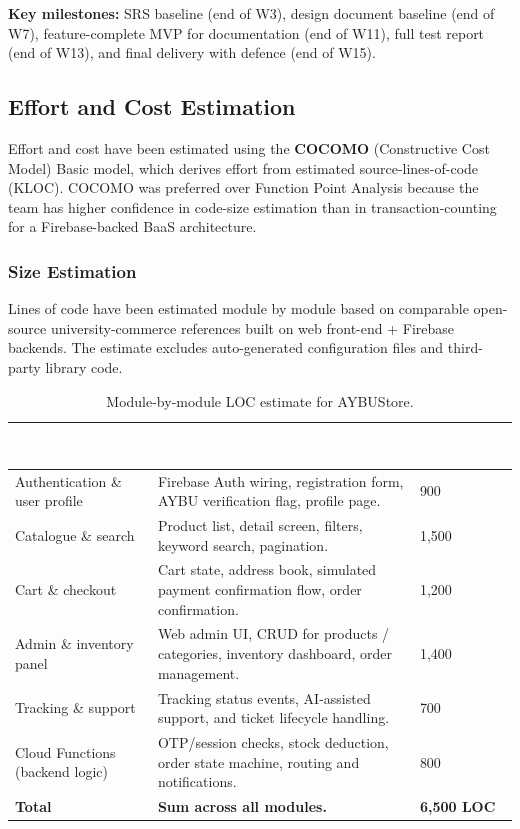 \documentclass[11pt,a4paper]{article}
\begin{document}
\noindent
\textbf{Key milestones:} SRS baseline (end of W3), design document
baseline (end of W7), feature-complete MVP for documentation
(end of W11), full test report (end of W13), and final delivery with
defence (end of W15).
 
\subsection{Effort and Cost Estimation}
\label{subsec:effort-cost}
Effort and cost have been estimated using the \textbf{COCOMO}
(Constructive Cost Model) Basic model, which derives effort from
estimated source-lines-of-code (KLOC). COCOMO was preferred over
Function Point Analysis because the team has higher confidence in
code-size estimation than in transaction-counting for a
Firebase-backed BaaS architecture.
 
\subsubsection*{Size Estimation}
Lines of code have been estimated module by module based on
comparable open-source university-commerce references built on
web front-end + Firebase backends.
The estimate excludes auto-generated configuration files and
third-party library code.
 
\begin{table}[H]
\centering
\small
\begin{tabular}{|p{}|p{}|p{}|}
\hline
\rowcolor{aybuHeader}
\textcolor{white}{\textbf{Module}} &
\textcolor{white}{\textbf{Notes}} &
\textcolor{white}{\textbf{Estimated LOC}} \\ \hline
 
Authentication \& user profile & Firebase Auth wiring, registration
form, AYBU verification flag, profile page. & 900 \\ \hline
Catalogue \& search & Product list, detail screen, filters, keyword
search, pagination. & 1{,}500 \\ \hline
Cart \& checkout & Cart state, address book, simulated payment
confirmation flow, order confirmation. & 1{,}200 \\ \hline
Admin \& inventory panel & Web admin UI, CRUD for products /
categories, inventory dashboard, order management. & 1{,}400 \\ \hline
Tracking \& support & Tracking status events, AI-assisted support, and
ticket lifecycle handling. & 700 \\ \hline
Cloud Functions (backend logic) & OTP/session checks, stock deduction,
order state machine, routing and notifications. & 800 \\ \hline
\textbf{Total} & \textbf{Sum across all modules.} &
\textbf{6{,}500 LOC} \\ \hline
\end{tabular}
\caption{Module-by-module LOC estimate for AYBUStore.}
\label{tab:kloc}
\end{table}
 
\end{document}
